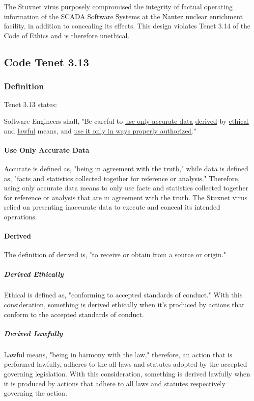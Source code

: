 \documentclass[12pt]{article}
\begin{document}
\begin{multicols}{2}
The Stuxnet virus purposely compromised the integrity of factual operating information of the SCADA Software Systems at the Nantez nuclear enrichment facility, in addition to concealing its effects. This design violates Tenet 3.14 of the Code of Ethics and is therefore unethical.


\subsection{Code Tenet 3.13}

\subsubsection{Definition}

Tenet 3.13  states:
\begin{framed}
Software Engineers shall, "Be careful to \ul{use only accurate data} \ul{derived} by \ul{ethical} and \ul{lawful} means, and \ul{use it only in ways properly authorized}."\cite{softwareEngineeringCodeOfEthics}
\end{framed}

\paragraph{Use Only Accurate Data}
Accurate is defined as, "being in agreement with the truth," while data is defined as, "facts and statistics collected together for reference or analysis."\cite{cambridgeDictionary} Therefore, using only accurate data means to only use facts and statistics collected together for reference or analysis that are in agreement with the truth. The Stuxnet virus relied on presenting inaccurate data to execute and conceal its intended operations.

\paragraph{Derived}
The definition of derived is, "to receive or obtain from a source or origin."\cite{softwareDefinition}

\subparagraph{Derived Ethically}
Ethical is defined as, "conforming to accepted standards of conduct."\cite{cambridgeDictionary} With this consideration, something is derived ethically when it's produced by actions that conform to the accepted standards of conduct.

\subparagraph{Derived Lawfully}
Lawful means, "being in harmony with the law," therefore, an action that is performed lawfully, adheres to the all laws and statutes adopted by the accepted governing legislation.\cite{cambridgeDictionary} With this consideration, something is derived lawfully when it is produced by actions that adhere to all laws and statutes respectively governing the action.


\end{multicols}
\end{document}
